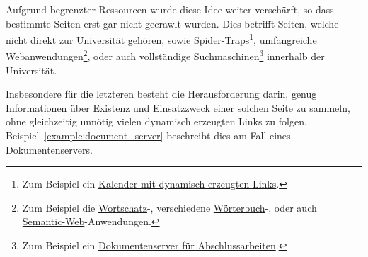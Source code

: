 Aufgrund begrenzter Ressourcen wurde diese Idee weiter verschärft,
so dass bestimmte Seiten erst gar nicht gecrawlt wurden.
Dies betrifft Seiten, welche nicht direkt zur Universität gehören,
sowie Spider-Traps\footnote{Zum Beispiel ein
\href{http://www.informatik.uni-leipzig.de/~meyer/?d=15}{Kalender mit dynamisch erzeugten Links}.},
umfangreiche Webanwendungen\footnote{Zum Beispiel die 
\href{http://wortschatz.uni-leipzig.de/de}{Wortschatz}-, verschiedene 
\href{http://www.informatik.uni-leipzig.de/~duc/TD/td/index.php?bpos=72&db=ev}{Wörterbuch}-, oder auch
\href{http://pcai003.informatik.uni-leipzig.de/kosemnet/}{Semantic-Web}-Anwendungen.},
oder auch vollständige Suchmaschinen\footnote{Zum Beispiel ein
\href{http://lips.informatik.uni-leipzig.de/}{Dokumentenserver für Abschlussarbeiten}.} innerhalb der Universität.

Insbesondere für die letzteren besteht die Herausforderung darin,
genug Informationen über Existenz und Einsatzzweck einer solchen Seite zu sammeln,
ohne gleichzeitig unnötig vielen dynamisch erzeugten Links zu folgen.
Beispiel~\ref{example:document_server} beschreibt dies am Fall eines Dokumentenservers.

